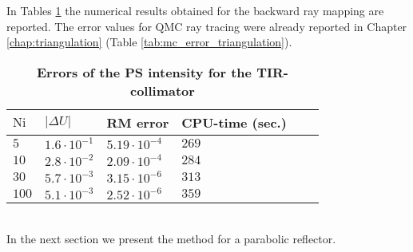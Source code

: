 In Tables \ref{tab:ray_mapping_tir} the numerical results obtained for the backward ray mapping are reported. The error values for QMC ray tracing were already reported in Chapter \ref{chap:triangulation} (Table \ref{tab:mc_error_triangulation}).
\begin{table}[t] 
\centering
\caption{\bf Errors of the PS intensity for the TIR-collimator}
\begin{tabular}{llllll}
 \hline  $\textrm{Ni}$\; & $|\Delta U|$  & RM error & CPU-time (sec.)\\
  \hline 
 $5$    & $1.6\cdot 10^{-1}$   & $5.19\cdot10^{-4}$     & $269$  \\
$10$    & $2.8\cdot 10^{-2}$ & $2.09\cdot 10^{-4}$   & $284$   \\
$30$   & $5.7 \cdot 10^{-3}$ & $3.15\cdot 10^{-6}$   & $313$  \\
$100$  & $5.1 \cdot 10^{-3}$ & $2.52\cdot 10^{-6}$   & $359$  \\
 \hline
 \end{tabular}
 \label{tab:ray_mapping_tir}
 \end{table}
\\ \indent In the next section we present the method for a parabolic reflector.

